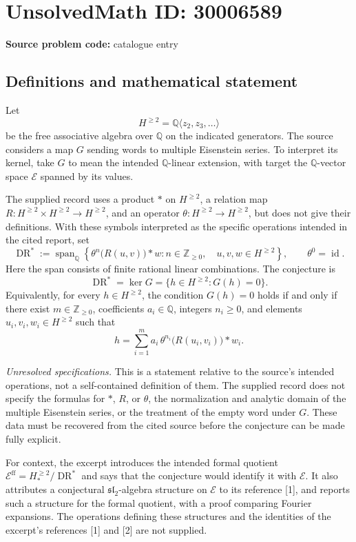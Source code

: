 \documentclass[11pt]{article}
\newcommand{\Z}{\mathbb{Z}}
\newcommand{\Q}{\mathbb{Q}}
\begin{document}
\section*{UnsolvedMath ID: 30006589}
\textbf{Source problem code:} catalogue entry
\subsection{Definitions and mathematical statement}
Let
\[
H^{\geq 2}=\Q\langle z_2,z_3,\ldots\rangle
\]
be the free associative algebra over \(\Q\) on the indicated generators. The source considers a map \(G\) sending words to multiple Eisenstein series. To interpret its kernel, take \(G\) to mean the intended \(\Q\)-linear extension, with target the \(\Q\)-vector space \(\mathcal E\) spanned by its values.

The supplied record uses a product \(*\) on \(H^{\geq 2}\), a relation map \(R\colon H^{\geq 2}\times H^{\geq 2}\to H^{\geq 2}\), and an operator \(\theta\colon H^{\geq 2}\to H^{\geq 2}\), but does not give their definitions. With these symbols interpreted as the specific operations intended in the cited report, set
\[
\operatorname{DR}^{*}
:=\operatorname{span}_{\Q}
\left\{\theta^n\bigl(R(u,v)\bigr)*w:
 n\in\Z_{\geq 0},\quad u,v,w\in H^{\geq 2}\right\},
\qquad \theta^0=\operatorname{id}.
\]
Here the span consists of finite rational linear combinations. The conjecture is
\[
\operatorname{DR}^{*}=\ker G
=\{h\in H^{\geq 2}:G(h)=0\}.
\]
Equivalently, for every \(h\in H^{\geq 2}\), the condition \(G(h)=0\) holds if and only if there exist \(m\in\Z_{\geq 0}\), coefficients \(a_i\in\Q\), integers \(n_i\geq 0\), and elements \(u_i,v_i,w_i\in H^{\geq 2}\) such that
\[
h=\sum_{i=1}^{m}a_i\,\theta^{n_i}\bigl(R(u_i,v_i)\bigr)*w_i.
\]

\textit{Unresolved specifications.} This is a statement relative to the source's intended operations, not a self-contained definition of them. The supplied record does not specify the formulas for \(*\), \(R\), or \(\theta\), the normalization and analytic domain of the multiple Eisenstein series, or the treatment of the empty word under \(G\). These data must be recovered from the cited source before the conjecture can be made fully explicit.

For context, the excerpt introduces the intended formal quotient \(\mathcal E^{\mathrm{ff}}=H^{\geq 2}_{*}/\operatorname{DR}^{*}\) and says that the conjecture would identify it with \(\mathcal E\). It also attributes a conjectural \(\mathfrak{sl}_2\)-algebra structure on \(\mathcal E\) to its reference [1], and reports such a structure for the formal quotient, with a proof comparing Fourier expansions. The operations defining these structures and the identities of the excerpt's references [1] and [2] are not supplied.
\end{document}
